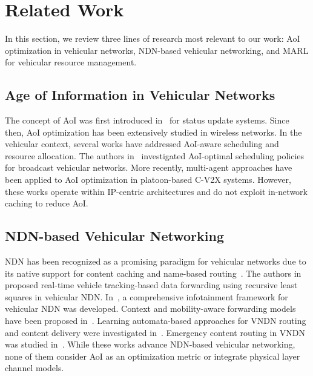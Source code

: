 \documentclass[journal]{IEEEtran}
\begin{document}
\section{Related Work} \label{sec2}

In this section, we review three lines of research most relevant to our work: AoI optimization in vehicular networks, NDN-based vehicular networking, and MARL for vehicular resource management.

\subsection{Age of Information in Vehicular Networks}

The concept of AoI was first introduced in~\cite{Kaul2012} for status update systems. Since then, AoI optimization has been extensively studied in wireless networks. In the vehicular context, several works have addressed AoI-aware scheduling and resource allocation. The authors in~\cite{Sun2019} investigated AoI-optimal scheduling policies for broadcast vehicular networks. More recently, multi-agent approaches have been applied to AoI optimization in platoon-based C-V2X systems. However, these works operate within IP-centric architectures and do not exploit in-network caching to reduce AoI.

\subsection{NDN-based Vehicular Networking}

NDN has been recognized as a promising paradigm for vehicular networks due to its native support for content caching and name-based routing~\cite{Dhara2023, Wang2024a}. The authors in~\cite{Khan2024} proposed real-time vehicle tracking-based data forwarding using recursive least squares in vehicular NDN. In~\cite{Lim2024}, a comprehensive infotainment framework for vehicular NDN was developed. Context and mobility-aware forwarding models have been proposed in~\cite{Silva2024}. Learning automata-based approaches for VNDN routing and content delivery were investigated in~\cite{Wang2024a}. Emergency content routing in VNDN was studied in~\cite{Wang2024b}. While these works advance NDN-based vehicular networking, none of them consider AoI as an optimization metric or integrate physical layer channel models.
\end{document}
